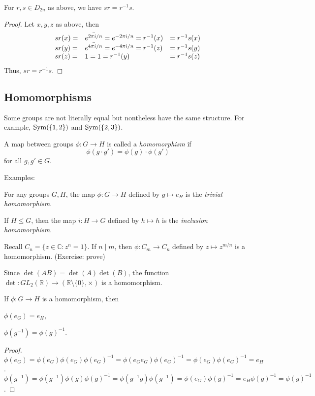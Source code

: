 \documentclass[12pt]{article}
\begin{document}
\begin{lemma}
    For $r,s \in D_{2n}$ as above, we have $sr = r^{-1}s$.
\end{lemma}
\begin{proof}
    Let $x,y,z$ as above, then
    \[
        \begin{array}{l l l}
            sr(x) =& \bar{e^{2\pi i/n}} = e^{-2\pi i/n} = r^{-1}(x) &= r^{-1}s(x)\\
            sr(y) =& \bar{e^{4\pi i/n}} = e^{-4\pi i/n} = r^{-1}(z) &= r^{-1}s(y)\\
            sr(z) =& \bar{1} = 1 = r^{-1}(y) &= r^{-1}s(z)\\
        \end{array}
    \]
    Thus, $sr = r^{-1}s$.
\end{proof}

\subsection{Homomorphisms}

Some groups are not literally equal
but nontheless have the same structure.
For example, $\operatorname{Sym}(\{1,2\})$ and $\operatorname{Sym}(\{2,3\})$.

\begin{definition}
     A map between groups $\phi : G \to H$ is called
     a \emph{homomorphism} if
     \[
         \phi(g \cdot g') = \phi(g)\cdot\phi(g')
     \]
     for all $g,g' \in G$.
\end{definition}

Examples:
\begin{compactenum}[(i)]
\item For any groups $G,H$, the map $\phi : G \to H$ defined by $g \mapsto e_H$
    is the \emph{trivial homomorphism}.
\item If $H \le G$, then the map $i : H \to G$ defined by $h \mapsto h$
    is the \emph{inclusion homomorphism}.
\item Recall $C_n = \{z \in \mathbb{C} : z^{n} = 1\}$.
    If $n \mid m$, then $\phi : C_m \to C_n$
    defined by $z \mapsto z^{m/n}$ is a homomorphism. (Exercise: prove)
\item Since $\det(AB) = \det(A)\det(B)$,
    the function $\det : GL_2(\mathbb{R}) \to (\mathbb{R} \setminus \{0\}, \times)$
    is a homomorphism.
\end{compactenum}

\begin{lemma}
    If $\phi : G \to H$ is a homomorphism, then
    \begin{compactenum}
    \item $\phi(e_G) = e_H$,
    \item $\phi(g^{-1}) = \phi(g)^{-1}$.
    \end{compactenum}
\end{lemma}
\begin{proof}
    $\phi(e_G) = \phi(e_G)\phi(e_G)\phi(e_G)^{-1} = \phi(e_Ge_G)\phi(e_G)^{-1} = \phi(e_G)\phi(e_G)^{-1} = e_H$.\\
    $\phi(g^{-1}) = \phi(g^{-1})\phi(g)\phi(g)^{-1} = \phi(g^{-1}g)\phi(g^{-1}) = \phi(e_G)\phi(g)^{-1} = e_H\phi(g)^{-1} = \phi(g)^{-1}$.
\end{proof}
\end{document}
